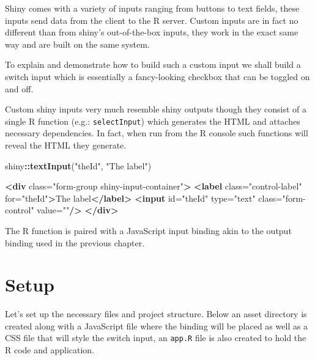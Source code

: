 \documentclass[
]{krantz}
\makeatletter
\newenvironment{Shaded}{\begin{snugshade}}{\end{snugshade}}
\newcommand{\KeywordTok}[1]{\textcolor[rgb]{0.27,0.27,0.27}{\textbf{#1}}}
\newcommand{\NormalTok}[1]{#1}
\newcommand{\OperatorTok}[1]{\textcolor[rgb]{0.43,0.43,0.43}{\textbf{#1}}}
\newcommand{\OtherTok}[1]{\textcolor[rgb]{0.37,0.37,0.37}{#1}}
\newcommand{\StringTok}[1]{\textcolor[rgb]{0.5,0.5,0.5}{#1}}
\newenvironment{kframe}{%
\medskip{}
\setlength{\fboxsep}{.8em}
 \def\at@end@of@kframe{}%
 \ifinner\ifhmode%
  \def\at@end@of@kframe{\end{minipage}}%
  \begin{minipage}{\columnwidth}%
 \fi\fi%
 \def\FrameCommand##1{\hskip\@totalleftmargin \hskip-\fboxsep
 \colorbox{shadecolor}{##1}\hskip-\fboxsep
     \hskip-\linewidth \hskip-\@totalleftmargin \hskip\columnwidth}%
 \MakeFramed {\advance\hsize-\width
   \@totalleftmargin\z@ \linewidth\hsize
   \@setminipage}}%
 {\par\unskip\endMakeFramed%
 \at@end@of@kframe}
\renewenvironment{Shaded}{\begin{kframe}}{\end{kframe}}
\makeatother
\begin{document}
Shiny comes with a variety of inputs ranging from buttons to text fields, these inputs send data from the client to the R server. Custom inputs are in fact no different than from shiny's out-of-the-box inputs, they work in the exact same way and are built on the same system.

To explain and demonstrate how to build such a custom input we shall build a switch input which is essentially a fancy-looking checkbox that can be toggled on and off.

Custom shiny inputs very much resemble shiny outputs though they consist of a single R function (e.g.: \texttt{selectInput}) which generates the HTML and attaches necessary dependencies. In fact, when run from the R console such functions will reveal the HTML they generate.

\begin{Shaded}
\begin{Highlighting}[]
\NormalTok{shiny}\OperatorTok{::}\KeywordTok{textInput}\NormalTok{(}\StringTok{"theId"}\NormalTok{, }\StringTok{"The label"}\NormalTok{)   }
\end{Highlighting}
\end{Shaded}

\begin{Shaded}
\begin{Highlighting}[]
\KeywordTok{\textless{}div}\OtherTok{ class=}\StringTok{"form{-}group shiny{-}input{-}container"}\KeywordTok{\textgreater{}}
  \KeywordTok{\textless{}label}\OtherTok{ class=}\StringTok{"control{-}label"}\OtherTok{ for=}\StringTok{"theId"}\KeywordTok{\textgreater{}}\NormalTok{The label}\KeywordTok{\textless{}/label\textgreater{}}
  \KeywordTok{\textless{}input}\OtherTok{ id=}\StringTok{"theId"}\OtherTok{ type=}\StringTok{"text"}\OtherTok{ class=}\StringTok{"form{-}control"}\OtherTok{ value=}\StringTok{""}\KeywordTok{/\textgreater{}}
\KeywordTok{\textless{}/div\textgreater{}}
\end{Highlighting}
\end{Shaded}

The R function is paired with a JavaScript input binding akin to the output binding used in the previous chapter.

\hypertarget{shiny-input-setup}{%
\section{Setup}\label{shiny-input-setup}}

Let's set up the necessary files and project structure. Below an asset directory is created along with a JavaScript file where the binding will be placed as well as a CSS file that will style the switch input, an \texttt{app.R} file is also created to hold the R code and application.
\end{document}

